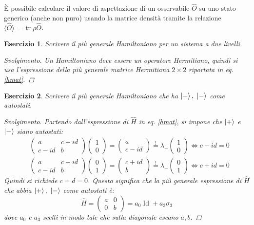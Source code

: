 \documentclass[11pt, a4paper]{scrartcl} %
\numberwithin{equation}{subsection}
\theoremstyle{style2}
\theoremstyle{style1}
\newtheorem{esercizio}{Esercizio}[section]
\renewcommand\qedsymbol{$\blacksquare$}
\newenvironment{svolgimento}{\renewcommand\qedsymbol{$\spadesuit$}\begin{proof}[Svolgimento]}{\end{proof}}
\begin{document}
\`E possibile calcolare il valore di aspettazione di un osservabile $\hat{O}$ su uno stato generico (anche non puro) usando la matrice densit\`a tramite la relazione $\langle \hat{O} \rangle = \operatorname{tr} \rho  \hat{O}$.
\begin{esercizio}\label{esh2l}
	Scrivere il pi\`u generale Hamiltoniano per un sistema a due livelli.
	\begin{svolgimento}
		Un Hamiltoniano deve essere un operatore Hermitiano, quindi si usa l'espressione della pi\`u generale matrice Hermitiana $2\times 2$ riportata in eq. \ref{hmat}.
	\end{svolgimento}
\end{esercizio}
\begin{esercizio}
	Scrivere il pi\`u generale Hamiltoniano che ha $\ket{+} , \  \ket{-} $ come autostati.
	\begin{svolgimento}
		Partendo dall'espressione di $\hat{H}$ in eq. \ref{hmat}, si impone che $\ket{+} $ e $\ket{-} $ siano autostati:
		\[
		\begin{split}
			&\begin{pmatrix} a & c+ id \\ c-id & b \end{pmatrix} \begin{pmatrix} 1 \\0 \end{pmatrix}= \begin{pmatrix} a \\ c-id \end{pmatrix}  \stackrel{!}{=} \lambda_+ \begin{pmatrix} 1\\0 \end{pmatrix} \iff c-id = 0\\
			&\begin{pmatrix} a & c+id \\ c-id & b \end{pmatrix} \begin{pmatrix} 0\\1 \end{pmatrix} = \begin{pmatrix} c+id \\ b \end{pmatrix} \stackrel{!}{=} \lambda _- \begin{pmatrix} 0 \\1 \end{pmatrix} \iff c+id = 0
		\end{split}
		\] 
		Quindi si richiede $c=d = 0$. 
		Questo significa che la pi\`u generale espressione di $\hat{H}$ che abbia $\ket{+} , \ \ket{-} $ come autostati \`e:
	\begin{equation}
		\hat{H} = \begin{pmatrix} a  &  0 \\ 0 &  b \end{pmatrix} = a_0 \operatorname{Id} + a_3 \sigma _3
	\end{equation}	
	dove $a_0$ e $a_3$ scelti in modo tale che sulla diagonale escano $a,b$.
	\end{svolgimento}
\end{esercizio}
\end{document}
